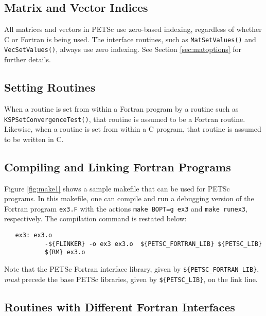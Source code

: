 {\subsection{Matrix and Vector Indices}

All matrices and vectors in PETSc use zero-based indexing, regardless
of whether C or Fortran is being used.  The interface routines, such
as {\tt MatSetValues()} and {\tt VecSetValues()}, always use zero
indexing.  See Section \ref{sec:matoptions} for further details.

\subsection{Setting Routines}

When a routine is set from within a Fortran program by a routine such
as {\tt KSPSetConvergenceTest()}, that routine is assumed to be a
Fortran routine. Likewise, when a routine is set from within a C
program, that routine is assumed to be written in C.

\subsection{Compiling and Linking Fortran Programs}
\label{sec:fortcompile}

Figure \ref{fig:make1} shows a sample makefile that can be used for
PETSc programs.  In this makefile, one can compile and run a debugging version
of the Fortran program {\tt ex3.F} with the actions {\tt make BOPT=g ex3} and
{\tt make runex3}, respectively. The compilation command is restated below:
\begin{verbatim}
   ex3: ex3.o 
           -${FLINKER} -o ex3 ex3.o  ${PETSC_FORTRAN_LIB} ${PETSC_LIB}
           ${RM} ex3.o
\end{verbatim}
Note that the PETSc Fortran interface library, given by 
{\tt \$\{PETSC\_FORTRAN\_LIB\}}, {\em must}   precede
the base PETSc libraries, given by {\tt \$\{PETSC\_LIB\}}, 
on the link line.

\subsection{Routines with Different Fortran Interfaces}
\label{sec:fortran_exceptions}

}
